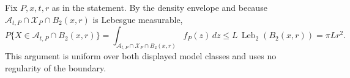 Fix \(P,x,t,r\) as in the statement.  By the density envelope and because \(\mathcal A_{t,P}\cap\mathcal X_P\cap B_2(x,r)\) is Lebesgue measurable,
\[
 P\{X\in\mathcal A_{t,P}\cap B_2(x,r)\}
 =\int_{\mathcal A_{t,P}\cap\mathcal X_P\cap B_2(x,r)}f_P(z)\,dz
 \leq L\,\operatorname{Leb}_2(B_2(x,r))=\pi Lr^2.
\]
This argument is uniform over both displayed model classes and uses no regularity of the boundary.